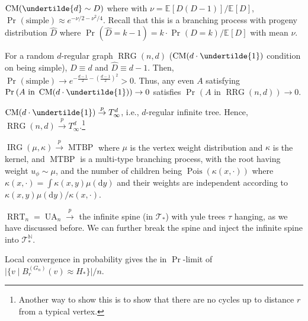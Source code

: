 \begin{eg}
	\(\operatorname{CM}(\undertilde{d} \sim D) \) where with \(\nu = \mathbb{E}_{}[D(D-1)] / \mathbb{E}_{}[D] \), \(\Pr_{}\left(\text{simple} \right) \approx e^{-\nu / 2 - \nu ^2 / 4}\). Recall that this is a branching process with progeny distribution \(\hat{D} \) where \(\Pr_{}\left(\hat{D} = k - 1 \right) = k \cdot \Pr_{}\left(D = k\right) / \mathbb{E}_{}[D] \) with mean \(\nu \).
\end{eg}

\begin{eg}
	For a random \(d\)-regular graph \(\operatorname{RRG}(n, d) \) (\(\operatorname{CM}(d \cdot \undertilde{1}) \) condition on being simple), \(D \equiv d\)  and \(\hat{D} \equiv d - 1\). Then, \(\Pr_{}\left(\text{simple} \right) \to e^{- \frac{d-1}{2} - \left( \frac{d-1}{2} \right)^2 } > 0\). Thus, any even \(A\) satisfying \(\Pr_{}\left(A\text{ in } \operatorname{CM}(d \cdot \undertilde{1}) \right) \to 0\) satisfies \(\Pr_{}\left(A \text{ in } \operatorname{RRG}(n, d) \right) \to 0\).

	\(\operatorname{CM}(d \cdot \undertilde{1}) \overset{p}{\to} T_\infty ^d\), i.e., \(d\)-regular infinite tree. Hence, \(\operatorname{RRG}(n, d) \overset{p}{\to} T_\infty ^d\).\footnote{Another way to show this is to show that there are no cycles up to distance \(r\) from a typical vertex.}
\end{eg}

\begin{eg}
	\(\operatorname{IRG}(\mu , \kappa ) \overset{p}{\to} \operatorname{MTBP} \) where \(\mu \) is the vertex weight distribution and \(\kappa \) is the kernel, and \(\operatorname{MTBP} \) is a multi-type branching process, with the root having weight \(u_{\phi } \sim \mu \), and the number of children being \(\operatorname{Pois}(\kappa (x, \cdot)) \) where \(\kappa (x, \cdot) = \int \kappa (x, y) \mu (\mathrm{d} y)\) and their weights are independent according to \(\kappa (x, y) \mu (\mathrm{d} y) / \kappa (x, \cdot)\).
\end{eg}

\begin{eg}
	\(\operatorname{RRT}_n = \operatorname{UA}_n \overset{p}{\to} \) the infinite spine (in \(\mathcal{T} _{\ast} \)) with yule trees \(\tau \) hanging, as we have discussed before. We can further break the spine and inject the infinite spine into \(\mathcal{T} _{\ast} ^{\mathbb{N} }\).
\end{eg}

\begin{note}[Consequence]
	Local convergence in probability gives the in \(\Pr\)-limit of \(\lvert \{ v \mid B_r^{(G_n)}(v) \approx H_{\ast} \} \rvert / n\).
\end{note}

